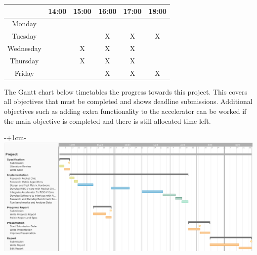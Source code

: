 \documentclass[a4paper,fleqn,12pt]{article}
\begin{document}
	\begin{table}[h]
		\centering
		\begin{tabular}{c|c|c|c|c|c|}
			\cline{2-6}
			& 14:00 & 15:00 & 16:00 & 17:00 & 18:00 \\ \hline
			\multicolumn{1}{|c|}{Monday}    &       &       &       &       &       \\ \hline
			\multicolumn{1}{|c|}{Tuesday}   &       &       & X     & X     & X     \\ \hline
			\multicolumn{1}{|c|}{Wednesday} &       & X     & X     & X     &       \\ \hline
			\multicolumn{1}{|c|}{Thursday}  &       & X     & X     & X     &       \\ \hline
			\multicolumn{1}{|c|}{Friday}    &       &       & X     & X     & X     \\ \hline
		\end{tabular}
	\end{table}

	The Gantt chart below timetables the progress towards this project. This covers all objectives that must be completed and shows deadline submissions. Additional objectives such as adding extra functionality to the accelerator can be worked if the main objective is completed and there is still allocated time left.
	
	\begin{adjustwidth}{-\oddsidemargin-1in+1cm}{-\rightmargin}
		\centering
		\includegraphics[width=\paperwidth-2cm, frame]{./timeline.png}
	\end{adjustwidth}
	
\end{document}
